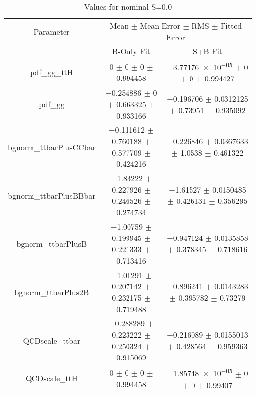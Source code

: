 \begin{table}
\centering
\caption{Values for nominal S=0.0}
\begin{tabular}{ccc}
\toprule
Parameter & \multicolumn{2}{c}{Mean $\pm$ Mean Error $\pm$ RMS $\pm$ Fitted Error}\\
 & B-Only Fit & S+B Fit\\
\midrule
pdf\_gg\_ttH & \num{0} $\pm$ \num{0} $\pm$ \num{0} $\pm$ \num{0.994458} & \num{-3.77176e-05} $\pm$ \num{0} $\pm$ \num{0} $\pm$ \num{0.994427}\\
pdf\_gg & \num{-0.254886} $\pm$ \num{0} $\pm$ \num{0.663325} $\pm$ \num{0.933166} & \num{-0.196706} $\pm$ \num{0.0312125} $\pm$ \num{0.73951} $\pm$ \num{0.935092}\\
bgnorm\_ttbarPlusCCbar & \num{-0.111612} $\pm$ \num{0.760188} $\pm$ \num{0.577709} $\pm$ \num{0.424216} & \num{-0.226846} $\pm$ \num{0.0367633} $\pm$ \num{1.0538} $\pm$ \num{0.461322}\\
bgnorm\_ttbarPlusBBbar & \num{-1.83222} $\pm$ \num{0.227926} $\pm$ \num{0.246526} $\pm$ \num{0.274734} & \num{-1.61527} $\pm$ \num{0.0150485} $\pm$ \num{0.426131} $\pm$ \num{0.356295}\\
bgnorm\_ttbarPlusB & \num{-1.00759} $\pm$ \num{0.199945} $\pm$ \num{0.221333} $\pm$ \num{0.713416} & \num{-0.947124} $\pm$ \num{0.0135858} $\pm$ \num{0.378345} $\pm$ \num{0.718616}\\
bgnorm\_ttbarPlus2B & \num{-1.01291} $\pm$ \num{0.207142} $\pm$ \num{0.232175} $\pm$ \num{0.719488} & \num{-0.896241} $\pm$ \num{0.0143283} $\pm$ \num{0.395782} $\pm$ \num{0.73279}\\
QCDscale\_ttbar & \num{-0.288289} $\pm$ \num{0.223222} $\pm$ \num{0.250324} $\pm$ \num{0.915069} & \num{-0.216089} $\pm$ \num{0.0155013} $\pm$ \num{0.428564} $\pm$ \num{0.959363}\\
QCDscale\_ttH & \num{0} $\pm$ \num{0} $\pm$ \num{0} $\pm$ \num{0.994458} & \num{-1.85748e-05} $\pm$ \num{0} $\pm$ \num{0} $\pm$ \num{0.99407}\\
\bottomrule
\end{tabular}
\end{table}